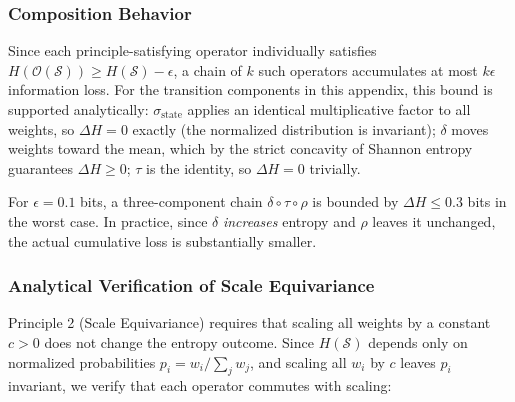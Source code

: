 \documentclass[11pt,a4paper]{article}
\begin{document}
\subsubsection{Composition Behavior}

Since each principle-satisfying operator individually satisfies 
$H(\mathcal{O}(\mathcal{S})) \geq H(\mathcal{S}) - \epsilon$, 
a chain of $k$ such operators accumulates at most $k\epsilon$ 
information loss. For the transition components in this appendix, this bound 
is supported analytically: $\sigma_{\mathrm{state}}$ applies an identical multiplicative 
factor to all weights, so $\Delta H = 0$ exactly (the normalized 
distribution is invariant); $\delta$ moves weights toward the mean, 
which by the strict concavity of Shannon entropy guarantees 
$\Delta H \geq 0$; $\tau$ is the identity, so $\Delta H = 0$ trivially.

For $\epsilon = 0.1$ bits, a three-component 
chain $\delta \circ \tau \circ \rho$ is bounded by 
$\Delta H \leq 0.3$ bits in the worst case. In practice, since 
$\delta$ \textit{increases} entropy and $\rho$ leaves it unchanged, 
the actual cumulative loss is substantially smaller.

\subsubsection{Analytical Verification of Scale Equivariance}

Principle 2 (Scale Equivariance) requires that scaling all weights by 
a constant $c > 0$ does not change the entropy outcome. Since 
$H(\mathcal{S})$ depends only on normalized probabilities 
$p_i = w_i / \sum_j w_j$, and scaling all $w_i$ by $c$ leaves 
$p_i$ invariant, we verify that each operator commutes with scaling:
\end{document}

